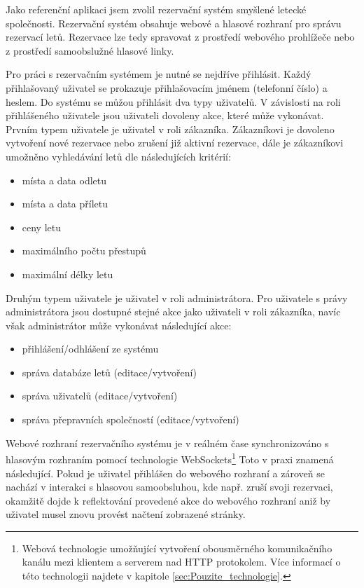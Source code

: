 \documentclass[ing,male,java,dept460]{diploma}						%
\begin{document}
Jako referenční aplikaci jsem zvolil rezervační systém smyšlené letecké společnosti. Rezervační systém obsahuje webové a hlasové rozhraní pro správu rezervací letů. Rezervace lze tedy spravovat z prostředí webového prohlížeče nebo z prostředí samoobslužné hlasové linky.

Pro práci s rezervačním systémem je nutné se nejdříve přihlásit. Každý přihlašovaný uživatel se prokazuje přihlašovacím jménem (telefonní číslo) a heslem. Do systému se můžou přihlásit dva typy uživatelů. V závislosti na roli přihlášeného uživatele jsou uživateli dovoleny akce, které může vykonávat. Prvním typem uživatele je uživatel v roli zákazníka. Zákazníkovi je dovoleno vytvoření nové rezervace nebo zrušení již aktivní rezervace, dále je zákazníkovi umožněno vyhledávání letů dle následujících kritérií:

\begin{itemize}
\item místa a data odletu
\item místa a data příletu
\item ceny letu
\item maximálního počtu přestupů
\item maximální délky letu
\end{itemize}

Druhým typem uživatele je uživatel v roli administrátora. Pro uživatele s právy administrátora jsou dostupné stejné akce jako uživateli v roli zákazníka, navíc však administrátor může vykonávat následující akce:

\begin{itemize}
\item přihlášení/odhlášení ze systému
\item správa databáze letů (editace/vytvoření)
\item správa uživatelů (editace/vytvoření)
\item správa přepravních společností (editace/vytvoření)
\end{itemize}

Webové rozhraní rezervačního systému je v reálném čase synchronizováno s hlasovým rozhraním pomocí technologie WebSockets\footnote{Webová technologie umožňující vytvoření obousměrného komunikačního kanálu mezi klientem a serverem nad HTTP protokolem. Více informací o této technologii najdete v kapitole \ref{sec:Pouzite_technologie}.} Toto v praxi znamená následující. Pokud je uživatel přihlášen do webového rozhraní a zároveň se nachází v interakci s hlasovou samoobsluhou, kde např. zruší svoji rezervaci, okamžitě dojde k reflektování provedené akce do webového rozhraní aniž by uživatel musel znovu provést načtení zobrazené stránky.
\end{document}
